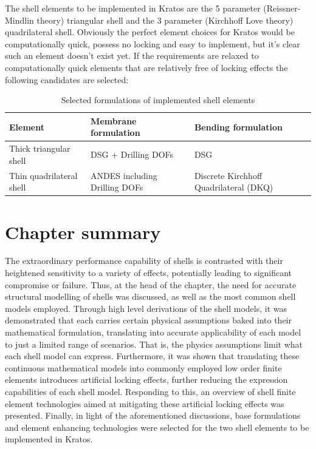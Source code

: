 The shell elements to be implemented in Kratos are the 5 parameter (Reissner-Mindlin theory) triangular shell and the 3 parameter (Kirchhoff Love theory) quadrilateral shell. Obviously the perfect element choices for Kratos would be computationally quick, possess no locking and easy to implement, but it's clear such an element doesn't exist yet. If the requirements are relaxed to computationally quick elements that are relatively free of locking effects the following candidates are selected:

\begin{table}[H]
	\begin{tabularx}{\textwidth}{ | l | X |  X | }
		\hline
		\textbf{Element} 		& 	\textbf{Membrane formulation}	&		\textbf{Bending formulation}	\\
		\hline
		Thick triangular shell
		&
		DSG + Drilling DOFs
		&
		DSG \\
		\hline
		Thin quadrilateral shell
		&
		ANDES including Drilling DOFs
		&
		Discrete Kirchhoff Quadrilateral (DKQ) \\
		\hline
	\end{tabularx}
	\caption{Selected formulations of implemented shell elements}
	\label{table:2}
\end{table}

\section{Chapter summary}
The extraordinary performance capability of shells is contrasted with their heightened sensitivity to a variety of effects, potentially leading to significant compromise or failure. Thus, at the head of the chapter, the need for accurate structural modelling of shells was discussed, as well as the most common shell models employed. Through high level derivations of the shell models, it was demonstrated that each carries certain physical assumptions baked into their mathematical formulation, translating into accurate applicability of each model to just a limited range of scenarios. That is, the physics assumptions limit what each shell model can express. Furthermore, it was shown that translating these continuous mathematical models into commonly employed low order finite elements introduces artificial locking effects, further reducing the expression capabilities of each shell model. Responding to this, an overview of shell finite element technologies aimed at mitigating these artificial locking effects was presented. Finally, in light of the aforementioned discussions, base formulations and element enhancing technologies were selected for the two shell elements to be implemented in Kratos.